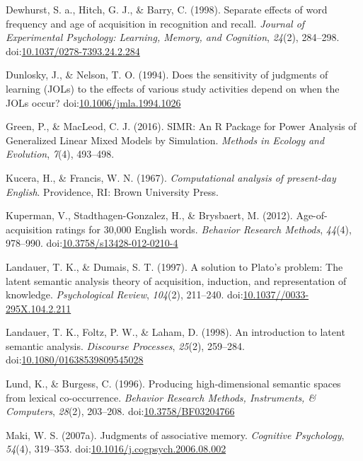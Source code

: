 \documentclass[english,man]{apa6}
\theoremstyle{definition}
\theoremstyle{definition}
\theoremstyle{definition}
\theoremstyle{remark}
\begin{document}
\hypertarget{ref-Dewhurst1998}{}
Dewhurst, S. a., Hitch, G. J., \& Barry, C. (1998). Separate effects of
word frequency and age of acquisition in recognition and recall.
\emph{Journal of Experimental Psychology: Learning, Memory, and
Cognition}, \emph{24}(2), 284--298.
doi:\href{https://doi.org/10.1037/0278-7393.24.2.284}{10.1037/0278-7393.24.2.284}

\hypertarget{ref-Dunlosky1994a}{}
Dunlosky, J., \& Nelson, T. O. (1994). Does the sensitivity of judgments
of learning (JOLs) to the effects of various study activities depend on
when the JOLs occur?
doi:\href{https://doi.org/10.1006/jmla.1994.1026}{10.1006/jmla.1994.1026}

\hypertarget{ref-Green2016}{}
Green, P., \& MacLeod, C. J. (2016). SIMR: An R Package for Power
Analysis of Generalized Linear Mixed Models by Simulation. \emph{Methods
in Ecology and Evolution}, \emph{7}(4), 493--498.

\hypertarget{ref-Kucera1967}{}
Kucera, H., \& Francis, W. N. (1967). \emph{Computational analysis of
present-day English}. Providence, RI: Brown University Press.

\hypertarget{ref-Kuperman2012}{}
Kuperman, V., Stadthagen-Gonzalez, H., \& Brysbaert, M. (2012).
Age-of-acquisition ratings for 30,000 English words. \emph{Behavior
Research Methods}, \emph{44}(4), 978--990.
doi:\href{https://doi.org/10.3758/s13428-012-0210-4}{10.3758/s13428-012-0210-4}

\hypertarget{ref-Landauer1997}{}
Landauer, T. K., \& Dumais, S. T. (1997). A solution to Plato's problem:
The latent semantic analysis theory of acquisition, induction, and
representation of knowledge. \emph{Psychological Review}, \emph{104}(2),
211--240.
doi:\href{https://doi.org/10.1037//0033-295X.104.2.211}{10.1037//0033-295X.104.2.211}

\hypertarget{ref-Landauer1998}{}
Landauer, T. K., Foltz, P. W., \& Laham, D. (1998). An introduction to
latent semantic analysis. \emph{Discourse Processes}, \emph{25}(2),
259--284.
doi:\href{https://doi.org/10.1080/01638539809545028}{10.1080/01638539809545028}

\hypertarget{ref-Lund1996}{}
Lund, K., \& Burgess, C. (1996). Producing high-dimensional semantic
spaces from lexical co-occurrence. \emph{Behavior Research Methods,
Instruments, \& Computers}, \emph{28}(2), 203--208.
doi:\href{https://doi.org/10.3758/BF03204766}{10.3758/BF03204766}

\hypertarget{ref-Maki2007a}{}
Maki, W. S. (2007a). Judgments of associative memory. \emph{Cognitive
Psychology}, \emph{54}(4), 319--353.
doi:\href{https://doi.org/10.1016/j.cogpsych.2006.08.002}{10.1016/j.cogpsych.2006.08.002}
\end{document}
